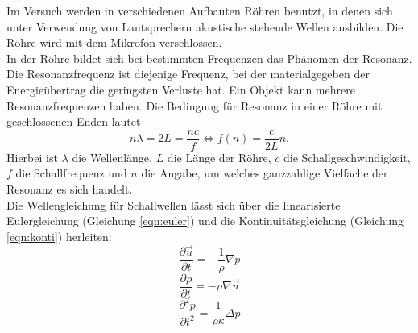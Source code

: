 Im Versuch werden in verschiedenen Aufbauten Röhren benutzt, in denen sich unter Verwendung von Lautsprechern akustische stehende Wellen ausbilden.
Die Röhre wird mit dem Mikrofon verschlossen.\\
%
In der Röhre bildet sich bei bestimmten Frequenzen das Phänomen der Resonanz.
Die Resonanzfrequenz ist diejenige Frequenz, bei der materialgegeben der Energieübertrag die geringsten Verluste hat.
Ein Objekt kann mehrere Resonanzfrequenzen haben.
Die Bedingung für Resonanz in einer Röhre mit geschlossenen Enden lautet
\begin{equation}
  n \lambda = 2 L = \frac{n c}{f} \Leftrightarrow f(n) = \frac{c}{2L} n.
  \label{eqn:resonanz}
\end{equation}
Hierbei ist $\lambda$ die Wellenlänge, $L$ die Länge der Röhre, $c$ die Schallgeschwindigkeit, $f$ die Schallfrequenz und $n$ die Angabe, um welches ganzzahlige Vielfache der Resonanz es sich handelt.\\
%
Die Wellengleichung für Schallwellen lässt sich über die linearisierte Eulergleichung (Gleichung \eqref{eqn:euler}) und die Kontinuitätsgleichung (Gleichung \eqref{eqn:konti}) herleiten:
\begin{equation}
  \frac{ \partial \vec{u}}{ \partial t} = - \frac{1}{\rho} \nabla p
  \label{eqn:euler}
\end{equation}
\begin{equation}
  \frac{\partial \rho}{ \partial t} = - \rho \nabla \vec{u}
  \label{eqn:konti}
\end{equation}
\begin{equation}
  \frac{ \partial^2 p}{\partial t^2} = \frac{1}{\rho \kappa} \Delta p
  \label{eqn:schallwelle}
\end{equation}


%
%
